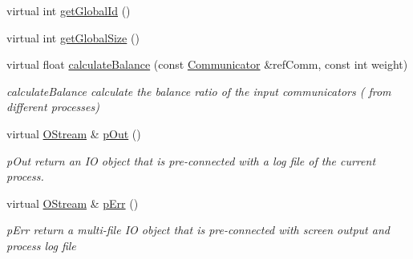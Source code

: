 \begin{DoxyCompactItemize}
\item 
virtual int \hyperlink{classHSF_1_1CommunicationManager_aaba8e09de5ff7ff523875e8d0a24c03e}{getGlobalId} ()
\item 
virtual int \hyperlink{classHSF_1_1CommunicationManager_aa6dbe644e35edc6dd37ddb16641077bf}{getGlobalSize} ()
\item 
virtual float \hyperlink{classHSF_1_1CommunicationManager_a7793e296e5d433a312894b1d59ddb0a5}{calculateBalance} (const \hyperlink{classHSF_1_1Communicator}{Communicator} \&refComm, const int weight)
\begin{DoxyCompactList}\small\item\em calculateBalance calculate the balance ratio of the input communicators ( from different processes) \item\end{DoxyCompactList}\item 
virtual \hyperlink{classHSF_1_1OStream}{OStream} \& \hyperlink{classHSF_1_1CommunicationManager_a90bf65f0e45df795cf861f829b82ac3d}{pOut} ()
\begin{DoxyCompactList}\small\item\em pOut return an IO object that is pre-\/connected with a log file of the current process. \item\end{DoxyCompactList}\item 
virtual \hyperlink{classHSF_1_1OStream}{OStream} \& \hyperlink{classHSF_1_1CommunicationManager_a416b9b36a5831fee0b931405bcad3e97}{pErr} ()
\begin{DoxyCompactList}\small\item\em pErr return a multi-\/file IO object that is pre-\/connected with screen output and process log file \item\end{DoxyCompactList}\end{DoxyCompactItemize}
